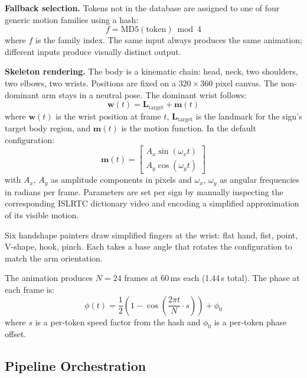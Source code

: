\documentclass[conference]{IEEEtran}
\begin{document}
\textbf{Fallback selection.} Tokens not in the database are assigned to one of four generic motion families using a hash:
\begin{equation}
f = \text{MD5}(\text{token}) \bmod 4
\label{eq:hash}
\end{equation}
where $f$ is the family index. The same input always produces the same animation; different inputs produce visually distinct output.

\textbf{Skeleton rendering.} The body is a kinematic chain: head, neck, two shoulders, two elbows, two wrists. Positions are fixed on a $320 \times 360$ pixel canvas. The non-dominant arm stays in a neutral pose. The dominant wrist follows:
\begin{equation}
\mathbf{w}(t) = \mathbf{L}_{\text{target}} + \mathbf{m}(t)
\label{eq:wrist}
\end{equation}
where $\mathbf{w}(t)$ is the wrist position at frame $t$, $\mathbf{L}_{\text{target}}$ is the landmark for the sign's target body region, and $\mathbf{m}(t)$ is the motion function. In the default configuration:
\begin{equation}
\mathbf{m}(t) = \begin{bmatrix} A_x \sin(\omega_x t) \\ A_y \cos(\omega_y t) \end{bmatrix}
\label{eq:motion}
\end{equation}
with $A_x$, $A_y$ as amplitude components in pixels and $\omega_x$, $\omega_y$ as angular frequencies in radians per frame. Parameters are set per sign by manually inspecting the corresponding ISLRTC dictionary video and encoding a simplified approximation of its visible motion.

Six handshape painters draw simplified fingers at the wrist: flat hand, fist, point, V-shape, hook, pinch. Each takes a base angle that rotates the configuration to match the arm orientation.

The animation produces $N = 24$ frames at 60\,ms each (1.44\,s total). The phase at each frame is:
\begin{equation}
\phi(t) = \frac{1}{2}\left(1 - \cos\left(\frac{2\pi t}{N} \cdot s\right)\right) + \phi_0
\label{eq:phase}
\end{equation}
where $s$ is a per-token speed factor from the hash and $\phi_0$ is a per-token phase offset.

\subsection{Pipeline Orchestration}
\end{document}

